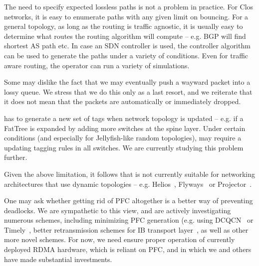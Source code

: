  The need to specify expected
lossless paths is not a problem in practice. For Clos networks, it is easy to
enumerate paths with any given limit on bouncing. For a general topology, as long
as the routing is traffic agnostic, it is usually easy to determine what routes
the routing algorithm will compute -- e.g. BGP will find shortest AS path etc.
In case an SDN controller is used, the controller algorithm can be used to
generate the paths under a variety of conditions. Even for traffic aware
routing, the operator can run a variety of simulations.

 Some may dislike the fact that we may eventually push
a wayward packet into a lossy queue. We stress that we do this only as a last
resort, and we reiterate that it does not mean that the packets are
automatically or immediately dropped.

 \sysname{} has to generate a new set of
tags when network topology is updated -- e.g. if a FatTree is expanded by adding
more switches at the spine layer. Under certain conditions (and especially for
Jellyfish-like random topologies), \sysname{} may require a updating tagging
rules in all switches. We are currently studying this problem further. 

 Given the above limitation, it follows that \sysname{}
is not currently suitable for networking architectures that use dynamic
topologies -- e.g. Helios~\cite{helios}, Flyways~\cite{flyways} or
Projector~\cite{projector}. 

 One may ask whether getting rid of PFC altogether is a
better way of preventing deadlocks.  We are sympathetic to this view, and are
actively investigating numerous schemes, including minimizing PFC generation
(e.g.  using DCQCN~\cite{dcqcn} or Timely~\cite{timely}, better retransmission
schemes for IB transport layer~\cite{xxx}, as well as other more novel schemes.
For now, we need \sysname{} ensure proper operation of currently deployed RDMA
hardware, which is reliant on PFC, and in which we and others have made
substantial investments.

